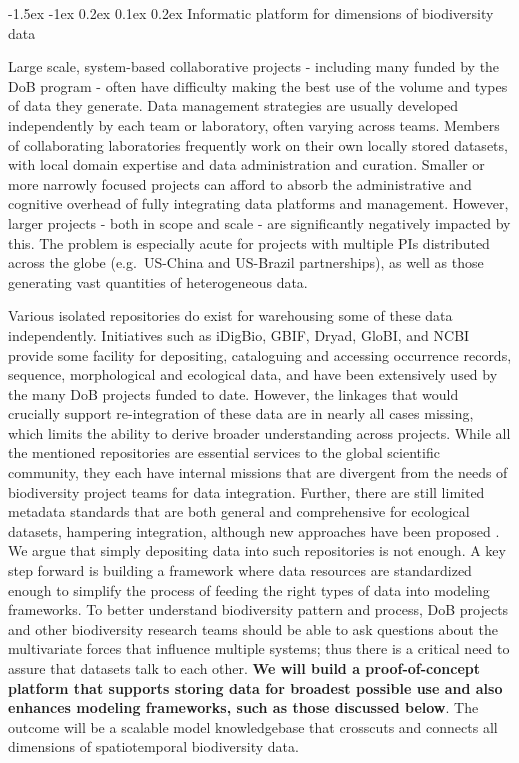 \documentclass[11pt]{article}
\makeatletter
\renewcommand\subsubsection{\@startsection{subsection}{1}{\z@}%
                                  {-1.5ex \@plus -1ex \@minus 0.2ex}%
                                  {0.1ex \@plus 0.2ex}%
                                  {\normalfont\bfseries}}
\makeatother
\begin{document}
\subsubsection{Informatic platform for dimensions of biodiversity
data}\label{informatic-platform-for-dimensions-of-biodiversity-data}

Large scale, system-based collaborative projects - including many funded
by the DoB program - often have difficulty making the best use of the
volume and types of data they generate. Data management strategies are
usually developed independently by each team or laboratory, often
varying across teams. Members of collaborating laboratories frequently
work on their own locally stored datasets, with local domain expertise
and data administration and curation. Smaller or more narrowly focused
projects can afford to absorb the administrative and cognitive overhead
of fully integrating data platforms and management. However, larger
projects - both in scope and scale - are significantly negatively
impacted by this. The problem is especially acute for projects with
multiple PIs distributed across the globe (e.g.~US-China and US-Brazil
partnerships), as well as those generating vast quantities of
heterogeneous data.

Various isolated repositories do exist for warehousing some of these
data independently. Initiatives such as iDigBio, GBIF, Dryad, GloBI, and
NCBI provide some facility for depositing, cataloguing and accessing
occurrence records, sequence, morphological and ecological data, and
have been extensively used by the many DoB projects funded to date.
However, the linkages that would crucially support re-integration of
these data are in nearly all cases missing, which limits the ability to
derive broader understanding across projects. While all the mentioned
repositories are essential services to the global scientific community,
they each have internal missions that are divergent from the needs of
biodiversity project teams for data integration. Further, there are
still limited metadata standards that are both general and comprehensive
for ecological datasets, hampering integration, although new approaches
have been proposed \cite{Guralnick2017-xb}. We argue that simply
depositing data into such repositories is not enough. A key step forward
is building a framework where data resources are standardized enough to
simplify the process of feeding the right types of data into modeling
frameworks. To better understand biodiversity pattern and process, DoB
projects and other biodiversity research teams should be able to ask
questions about the multivariate forces that influence multiple systems;
thus there is a critical need to assure that datasets talk to each
other. \textbf{We will build a proof-of-concept platform that
supports storing data for broadest possible use and also enhances
modeling frameworks, such as those discussed below}. The
outcome will be a scalable model knowledgebase that crosscuts and
connects all dimensions of spatiotemporal biodiversity data.
\end{document}
